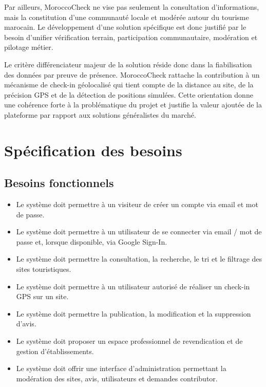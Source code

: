 ﻿\documentclass[12pt,a4paper]{report}
\begin{document}
Par ailleurs, MoroccoCheck ne vise pas seulement la consultation d'informations, mais la constitution d'une communaut\'e locale et mod\'er\'ee autour du tourisme marocain. Le d\'eveloppement d'une solution sp\'ecifique est donc justifi\'e par le besoin d'unifier v\'erification terrain, participation communautaire, mod\'eration et pilotage m\'etier.

Le crit\`ere diff\'erenciateur majeur de la solution r\'eside donc dans la fiabilisation des donn\'ees par preuve de pr\'esence. MoroccoCheck rattache la contribution \`a un m\'ecanisme de check-in g\'eolocalis\'e qui tient compte de la distance au site, de la pr\'ecision GPS et de la d\'etection de positions simul\'ees. Cette orientation donne une coh\'erence forte \`a la probl\'ematique du projet et justifie la valeur ajout\'ee de la plateforme par rapport aux solutions g\'en\'eralistes du march\'e.

\section{Sp\'ecification des besoins}
\subsection{Besoins fonctionnels}
\begin{itemize}
  \item Le syst\`eme doit permettre \`a un visiteur de cr\'eer un compte via email et mot de passe.
  \item Le syst\`eme doit permettre \`a un utilisateur de se connecter via email / mot de passe et, lorsque disponible, via Google Sign-In.
  \item Le syst\`eme doit permettre la consultation, la recherche, le tri et le filtrage des sites touristiques.
  \item Le syst\`eme doit permettre \`a un utilisateur autoris\'e de r\'ealiser un check-in GPS sur un site.
  \item Le syst\`eme doit permettre la publication, la modification et la suppression d'avis.
  \item Le syst\`eme doit proposer un espace professionnel de revendication et de gestion d'\'etablissements.
  \item Le syst\`eme doit offrir une interface d'administration permettant la mod\'eration des sites, avis, utilisateurs et demandes contributor.
\end{itemize}
\end{document}
